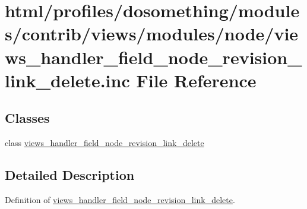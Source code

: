 \hypertarget{views__handler__field__node__revision__link__delete_8inc}{
\section{html/profiles/dosomething/modules/contrib/views/modules/node/views\_\-handler\_\-field\_\-node\_\-revision\_\-link\_\-delete.inc File Reference}
\label{views__handler__field__node__revision__link__delete_8inc}
}
\subsection*{Classes}
\begin{DoxyCompactItemize}
\item 
class \hyperlink{classviews__handler__field__node__revision__link__delete}{views\_\-handler\_\-field\_\-node\_\-revision\_\-link\_\-delete}
\end{DoxyCompactItemize}


\subsection{Detailed Description}
Definition of \hyperlink{classviews__handler__field__node__revision__link__delete}{views\_\-handler\_\-field\_\-node\_\-revision\_\-link\_\-delete}. 